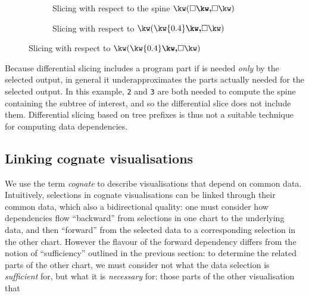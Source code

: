 \begin{figure}[H]
   \small
   \begin{subfigure}{0.45\textwidth}
      {}
   \caption{Slicing with respect to the spine $\exPair{\hole}{\hole}$}
   \end{subfigure}
   \begin{subfigure}{0.45\textwidth}
      {}
   \caption{Slicing with respect to $\exPair{\kw{0.4}}{\hole}$}
   \end{subfigure}
\end{figure}

\noindent Because differential slicing includes a program part if is needed \emph{only} by the selected output, in general it underapproximates the parts actually needed for the selected output. In this example, \lstinline{2} and \lstinline{3} are both needed to compute the spine containing the subtree of interest, and so the differential slice does not include them. Differential slicing based on tree prefixes is thus not a suitable technique for computing data dependencies.

\subsection{Linking cognate visualisations}

We use the term \emph{cognate} to describe visualisations that depend on common data. Intuitively, selections in cognate visualisations can be linked through their common data, which also a bidirectional quality: one must consider how dependencies flow ``backward'' from selections in one chart to the underlying data, and then ``forward'' from the selected data to a corresponding selection in the other chart. However the flavour of the forward dependency differs from the notion of ``sufficiency'' outlined in the previous section: to determine the related parts of the other chart, we must consider not what the data selection is \emph{sufficient} for, but what it is \emph{necessary} for: those parts of the other visualisation that




